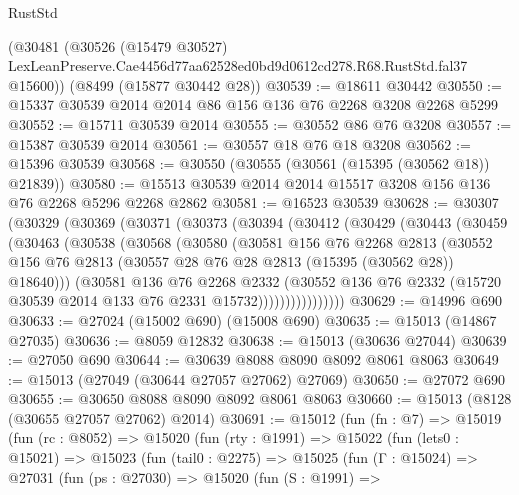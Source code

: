 \begin{lexlean}{RustStd}
\begin{coremodule}
    (@30481
      (@30526
        (@15479 @30527)
        LexLeanPreserve.Cae4456d77aa62528ed0bd9d0612cd278.R68.RustStd.fal37
        @15600))
    (@8499 (@15877 @30442 @28))
@30539 := @18611 @30442
@30550 := @15337 @30539 @2014 @2014 @86 @156 @136 @76 @2268 @3208 @2268 @5299
@30552 := @15711 @30539 @2014
@30555 := @30552 @86 @76 @3208
@30557 := @15387 @30539 @2014
@30561 := @30557 @18 @76 @18 @3208
@30562 := @15396 @30539
@30568 := @30550 (@30555 (@30561 (@15395 (@30562 @18)) @21839))
@30580 := @15513 @30539 @2014 @2014 @15517 @3208 @156 @136 @76 @2268 @5296 @2268 @2862
@30581 := @16523 @30539
@30628 := @30307
    (@30329
      (@30369
        (@30371
          (@30373
            (@30394
              (@30412
                (@30429
                  (@30443
                    (@30459
                      (@30463
                        (@30538
                          (@30568
                            (@30580
                              (@30581
                                @156
                                @76
                                @2268
                                @2813
                                (@30552
                                  @156
                                  @76
                                  @2813
                                  (@30557 @28 @76 @28 @2813 (@15395 (@30562 @28)) @18640)))
                              (@30581
                                @136
                                @76
                                @2268
                                @2332
                                (@30552
                                  @136
                                  @76
                                  @2332
                                  (@15720 @30539 @2014 @133 @76 @2331 @15732))))))))))))))))
@30629 := @14996 @690
@30633 := @27024 (@15002 @690) (@15008 @690)
@30635 := @15013 (@14867 @27035)
@30636 := @8059 @12832
@30638 := @15013 (@30636 @27044)
@30639 := @27050 @690
@30644 := @30639 @8088 @8090 @8092 @8061 @8063
@30649 := @15013 (@27049 (@30644 @27057 @27062) @27069)
@30650 := @27072 @690
@30655 := @30650 @8088 @8090 @8092 @8061 @8063
@30660 := @15013 (@8128 (@30655 @27057 @27062) @2014)
@30691 := @15012
    (fun (fn : @7) =>
    @15019
      (fun (rc : @8052) =>
      @15020
        (fun (rty : @1991) =>
        @15022
          (fun (lets0 : @15021) =>
          @15023
            (fun (tail0 : @2275) =>
            @15025
              (fun (Γ : @15024) =>
              @27031
                (fun (ps : @27030) =>
                @15020
                  (fun (S : @1991) =>

\end{coremodule}
\end{lexlean}

